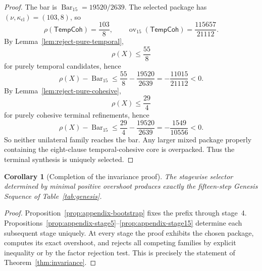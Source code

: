 \documentclass{lmcs}
\theoremstyle{plain}
\newtheorem{cor}[thm]{Corollary}
\theoremstyle{definition}
\theoremstyle{remark}
\newcommand{\SelBar}{\ensuremath{\operatorname{Bar}}}
\newcommand{\ov}{\ensuremath{\operatorname{ov}}}
\begin{document}
\begin{proof}
The bar is $\SelBar_{15}=19520/2639$.
The selected package has $(\nu,\kappa_{\mathrm{cl}})=(103,8)$, so
\[
  \rho(\mathsf{TempCoh})=\frac{103}{8},\qquad
  \ov_{15}(\mathsf{TempCoh})=\frac{115657}{21112}.
\]
By Lemma~\ref{lem:reject-pure-temporal},
\[
  \rho(X)\le \frac{55}{8}
\]
for purely temporal candidates, hence
\[
  \rho(X)-\SelBar_{15}\le \frac{55}{8}-\frac{19520}{2639}
  =-\frac{11015}{21112}<0.
\]
By Lemma~\ref{lem:reject-pure-cohesive},
\[
  \rho(X)\le \frac{29}{4}
\]
for purely cohesive terminal refinements, hence
\[
  \rho(X)-\SelBar_{15}\le \frac{29}{4}-\frac{19520}{2639}
  =-\frac{1549}{10556}<0.
\]
So neither unilateral family reaches the bar.
Any larger mixed package properly containing the eight-clause temporal-cohesive core is overpacked.
Thus the terminal synthesis is uniquely selected.
\end{proof}

\begin{cor}[Completion of the invariance proof]
\label{cor:appendix-complete}
The stagewise selector determined by minimal positive overshoot produces exactly the fifteen-step Genesis Sequence of Table~\ref{tab:genesis}.
\end{cor}

\begin{proof}
Proposition~\ref{prop:appendix-bootstrap} fixes the prefix through stage~4.
Propositions~\ref{prop:appendix-stage5}--\ref{prop:appendix-stage15} determine each subsequent stage uniquely.
At every stage the proof exhibits the chosen package, computes its exact overshoot, and rejects all competing families by explicit inequality or by the factor rejection test.
This is precisely the statement of Theorem~\ref{thm:invariance}.
\end{proof}
\end{document}
